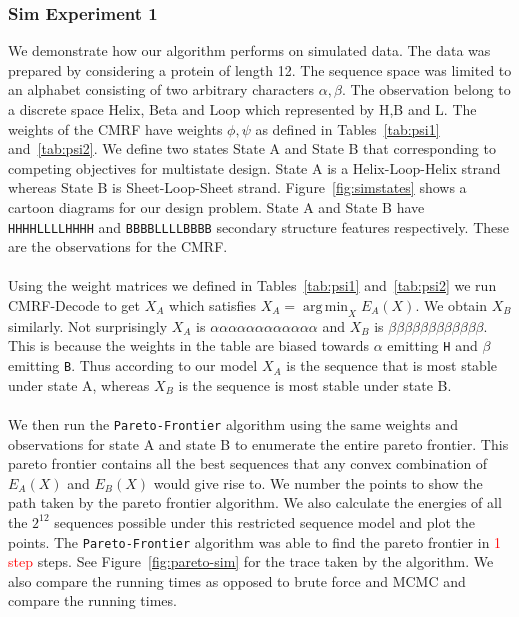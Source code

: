 \documentclass{article}
\DeclareMathOperator*{\argmin}{arg\,min}
\begin{document}
\subsubsection{Sim Experiment 1}
We demonstrate how our algorithm performs on simulated data. The data was prepared by considering a protein of length 12. The sequence space was limited to an alphabet consisting of two arbitrary characters $\alpha,\beta$. The observation belong to a discrete space Helix, Beta and Loop which represented by H,B and L. The weights of the CMRF have weights $\phi,\psi$ as defined in Tables~\ref{tab:psi1} and~\ref{tab:psi2}. We define two states State A and State B that corresponding to competing objectives for multistate design. State A is a Helix-Loop-Helix strand whereas State B is Sheet-Loop-Sheet strand. Figure~\ref{fig:simstates} shows a cartoon diagrams for our design problem. State A and State B have \texttt{HHHHLLLLHHHH} and \texttt{BBBBLLLLBBBB} secondary structure features respectively. These are the observations for the CMRF.
\\
\\
Using the weight matrices we defined in Tables~\ref{tab:psi1} and~\ref{tab:psi2} we run CMRF-Decode to get $X_A$ which satisfies $X_A = \argmin_X E_A(X)$. We obtain $X_B$ similarly. Not surprisingly $X_A$ is $\alpha\alpha\alpha\alpha\alpha\alpha\alpha\alpha\alpha\alpha\alpha\alpha$ 
and $X_B$ is $\beta\beta\beta\beta\beta\beta\beta\beta\beta\beta\beta\beta$. This is because the weights in the table are biased towards $\alpha$ emitting \texttt{H} and $\beta$ emitting \texttt{B}. Thus according to our model $X_A$ is the sequence that is most stable under state A, whereas $X_B$ is the sequence is most stable under state B.
\\
\\
We then run the \texttt{Pareto-Frontier} algorithm using the same weights and observations for state A and state B to enumerate the entire pareto frontier. This pareto frontier contains all the best sequences that any convex combination of $E_A(X)$ and $E_B(X)$ would give rise to. We number the points to show the path taken by the pareto frontier algorithm. We also calculate the energies of all the $2^{12}$ sequences possible under this restricted sequence model and plot the points. The \texttt{Pareto-Frontier} algorithm was able to find the pareto frontier in \textcolor{red}{1 step} steps. See Figure~\ref{fig:pareto-sim} for the trace taken by the algorithm.  We also compare the running times as opposed to brute force and MCMC and compare the running times. 
\end{document}
